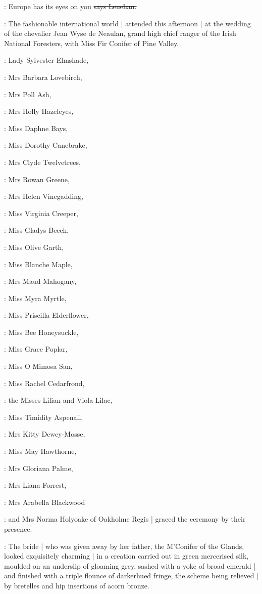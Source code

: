 \lenehan:
Europe has its eyes on you
\sout{says Lenehan.}

:
The fashionable international world |
attended  this afternoon |
at the wedding of the chevalier Jean Wyse de Neaulan,
grand high chief
ranger of the Irish National Foresters,
with Miss Fir Conifer of Pine Valley.

:
Lady Sylvester Elmshade,

:
Mrs Barbara Lovebirch,

:
Mrs Poll Ash,

:
Mrs Holly Hazeleyes,

:
Miss Daphne Bays,

:
Miss Dorothy Canebrake,

:
Mrs Clyde Twelvetrees,

:
Mrs Rowan Greene,

:
Mrs Helen Vinegadding,

:
Miss Virginia Creeper,

:
Miss Gladys Beech,

:
Miss Olive Garth,

:
Miss Blanche Maple,

:
Mrs Maud Mahogany,

:
Miss Myra Myrtle,

:
Miss Priscilla Elderflower,

:
Miss Bee Honeysuckle,

:
Miss Grace Poplar,

:
Miss O Mimosa San,

:
Miss Rachel Cedarfrond,

:
the Misses Lilian and Viola Lilac,

:
Miss Timidity Aspenall,

:
Mrs Kitty Dewey-Mosse,

:
Miss May Hawthorne,

:
Mrs Gloriana Palme,

:
Mrs Liana Forrest,

:
Mrs Arabella Blackwood

:
and Mrs Norma Holyoake of Oakholme Regis |
graced the ceremony by their presence.

:
The bride |
who was given away by her father,
the M'Conifer of the Glands,
looked exquisitely charming |
in a creation carried out in green mercerised silk,
moulded on an underslip of gloaming grey,
sashed with a yoke of broad emerald |
and finished with a triple flounce of darkerhued fringe,
the scheme being relieved |
by bretelles and hip insertions of acorn bronze.

